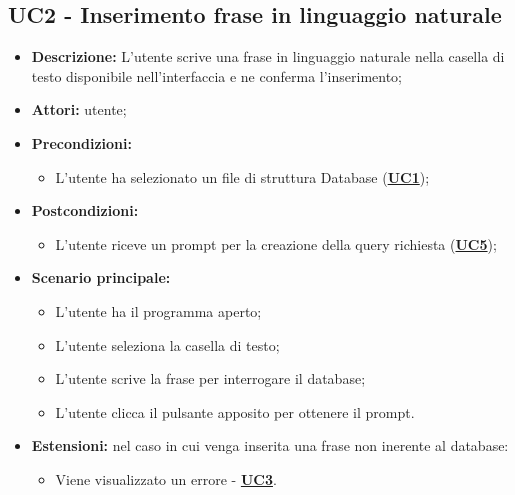 \documentclass[5pt]{article}
\begin{document}
\subsection{UC2 - Inserimento frase in linguaggio naturale}
\label{sec:UC2}
\begin{itemize}
    \item \textbf{Descrizione:} L’utente scrive una frase in linguaggio naturale nella casella di testo disponibile nell’interfaccia e ne conferma l’inserimento;
    \item \textbf{Attori:} utente;
    \item \textbf{Precondizioni:} 
    \begin{itemize}
        \item L’utente ha selezionato un file di struttura Database (\hyperref[sec:UC1]{\textbf{UC1}});
    \end{itemize}
    \item \textbf{Postcondizioni:} 
    \begin{itemize}
        \item L’utente riceve un prompt per la creazione della query richiesta (\hyperref[sec:UC5]{\textbf{UC5}});
    \end{itemize}
    \item \textbf{Scenario principale:} 
    \begin{itemize}
        \item L’utente ha il programma aperto;
        \item L’utente seleziona la casella di testo;
        \item L’utente scrive la frase per interrogare il database;
        \item L’utente clicca il pulsante apposito per ottenere il prompt.
    \end{itemize}
    \item \textbf{Estensioni:} nel caso in cui venga inserita una frase non inerente al database:
    \begin{itemize}
        \item Viene visualizzato un errore - \hyperref[sec:UC3]{\textbf{UC3}}.
    \end{itemize}
\end{itemize}
\end{document}
